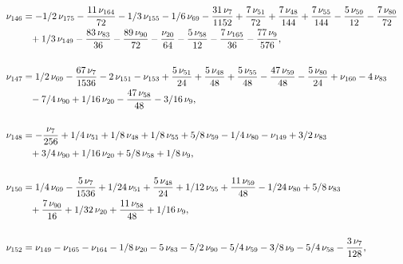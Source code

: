 \documentclass[a4paper,12pt, DIV=14, BCOR=5mm, twoside, headsepline]{scrbook}
\begin{document}
\begin{align}
\begin{aligned}
\\
\nu_{{146}}&=-1/2\,\nu_{{175}}-{\frac {11
\,\nu_{{164}}}{72}}-1/3\,\nu_{{155}}-1/6\,\nu_{{69}}-{\frac {31\,\nu_{
{7}}}{1152}}+{\frac {7\,\nu_{{51}}}{72}}+{\frac {7\,\nu_{{48}}}{144}}+
{\frac {7\,\nu_{{55}}}{144}}-{\frac {5\,\nu_{{59}}}{12}}-{\frac {7\,
\nu_{{80}}}{72}}\\
 &\hphantom{=}+1/3\,\nu_{{149}}-{\frac {83\,\nu_{{83}}}{36}}-{\frac 
{89\,\nu_{{90}}}{72}}-{\frac {\nu_{{20}}}{64}}-{\frac {5\,\nu_{{58}}}{
12}}-{\frac {7\,\nu_{{165}}}{36}}-{\frac {77\,\nu_{{9}}}{576}}, \\
\\
\nu_{{
147}}&=1/2\,\nu_{{69}}-{\frac {67\,\nu_{{7}}}{1536}}-2\,\nu_{{151}}-\nu
_{{153}}+{\frac {5\,\nu_{{51}}}{24}}+{\frac {5\,\nu_{{48}}}{48}}+{
\frac {5\,\nu_{{55}}}{48}}-{\frac {47\,\nu_{{59}}}{48}}-{\frac {5\,\nu
_{{80}}}{24}}+\nu_{{160}}-4\,\nu_{{83}}\\
 &\hphantom{=}-7/4\,\nu_{{90}}+1/16\,\nu_{{20
}}-{\frac {47\,\nu_{{58}}}{48}}-3/16\,\nu_{{9}}, \\
\\
\nu_{{148}}&=-{\frac {
\nu_{{7}}}{256}}+1/4\,\nu_{{51}}+1/8\,\nu_{{48}}+1/8\,\nu_{{55}}+5/8\,
\nu_{{59}}-1/4\,\nu_{{80}}-\nu_{{149}}+3/2\,\nu_{{83}}\\
 &\hphantom{=}+3/4\,\nu_{{90}}
+1/16\,\nu_{{20}}+5/8\,\nu_{{58}}+1/8\,\nu_{{9}}, \\
\\
\nu_{{150}}&=1/4\,\nu_
{{69}}-{\frac {5\,\nu_{{7}}}{1536}}+1/24\,\nu_{{51}}+{\frac {5\,\nu_{{
48}}}{24}}+1/12\,\nu_{{55}}+{\frac {11\,\nu_{{59}}}{48}}-1/24\,\nu_{{
80}}+5/8\,\nu_{{83}}\\
 &\hphantom{=}+{\frac {7\,\nu_{{90}}}{16}}+1/32\,\nu_{{20}}+{
\frac {11\,\nu_{{58}}}{48}}+1/16\,\nu_{{9}}, \\
\\
\nu_{{152}}&=\nu_{{149}}-
\nu_{{165}}-\nu_{{164}}-1/8\,\nu_{{20}}-5\,\nu_{{83}}-5/2\,\nu_{{90}}-
5/4\,\nu_{{59}}-3/8\,\nu_{{9}}-5/4\,\nu_{{58}}-{\frac {3\,\nu_{{7}}}{
128}}, 
\end{aligned}
\end{align}
\end{document}
